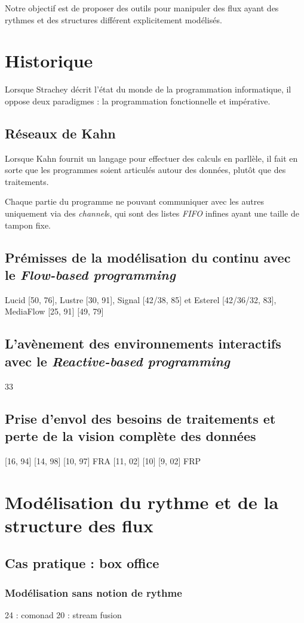 \documentclass{llncs}
\newcommand{\FB}{\emph{Flow-based programming}}
\newcommand{\RP}{\emph{Reactive-based programming}}
\begin{document}
Notre objectif est de proposer des outils pour manipuler des flux ayant des
rythmes et des structures différent explicitement modélisés.

\section{Historique}
Lorsque Strachey \cite{Strachey73} décrit l'état du monde de la programmation
informatique, il oppose deux paradigmes : la programmation fonctionnelle et impérative.

\subsection{Réseaux de Kahn}
Lorsque Kahn \cite{Kahn74} fournit un langage pour effectuer des calculs en parllèle,
il fait en sorte que les programmes soient articulés autour des données, plutôt que
des traitements.

Chaque partie du programme ne pouvant communiquer avec les autres uniquement via
des \emph{channel}s, qui sont des listes \emph{FIFO} infines ayant une taille de
tampon fixe.

\subsection{Prémisses de la modélisation du continu avec le \FB}
Lucid [50, 76], Lustre [30, 91], Signal [42/38, 85] et Esterel [42/36/32, 83], MediaFlow [25, 91]
[49, 79]
\subsection{L'avènement des environnements interactifs avec le \RP}
33
\subsection{Prise d'envol des besoins de traitements et perte de la vision complète des données}
[16, 94] [14, 98] [10, 97] FRA
[11, 02] [10] [9, 02] FRP

\section{Modélisation du rythme et de la structure des flux}
\subsection{Cas pratique : box office}
\subsubsection{Modélisation sans notion de rythme}
24 : comonad
20 : stream fusion
\end{document}
